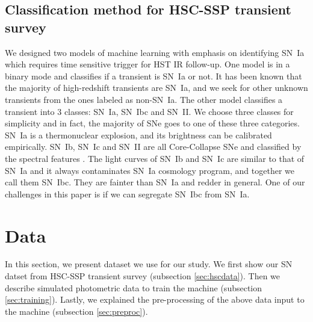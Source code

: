 \documentclass[proof]{pasj01}
\begin{document}
%
%
%
%
%

\subsection{Classification method for HSC-SSP transient survey}
We designed two models of machine learning with emphasis on identifying SN~Ia which requires time sensitive trigger for HST IR follow-up.
One model is in a binary mode and classifies if a transient is SN~Ia or not.
It has been known that the majority of high-redshift transients are SN~Ia, and we seek for other unknown transients from the ones labeled as non-SN~Ia.   
The other model classifies a transient into 3 classes: SN~Ia, SN~Ibc and SN~II.  
We choose three classes for simplicity and in fact, the majority of SNe goes to one of these three categories.
SN~Ia is a thermonuclear explosion, and its brightness can be calibrated empirically.
SN~Ib, SN~Ic and SN~II are all Core-Collapse SNe and classified by the spectral features \citep{filippenko97a}.
The light curves of SN~Ib and SN~Ic are similar to that of SN~Ia and it always contaminates SN~Ia cosmology program, and together we call them SN~Ibc.  They are fainter than SN~Ia and redder in general.
One of our challenges in this paper is if we can segregate SN~Ibc from SN~Ia.
%
%

\section{Data}
In this section, we present dataset we use for our study.
We first show our SN datset from HSC-SSP transient survey (subsection \ref{sec:hscdata}).
Then we describe simulated photometric data to train the machine (subsection \ref{sec:training}).
Lastly, we explained the pre-processing of the above data input to the machine (subsection \ref{sec:preproc}).
\end{document}
